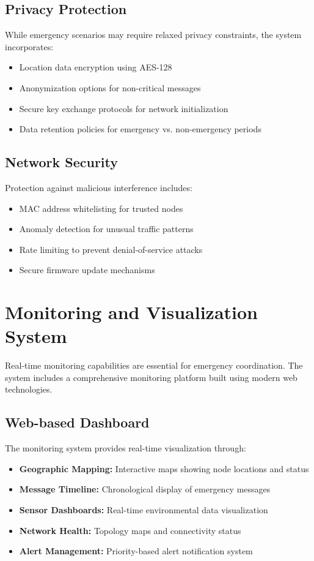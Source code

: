 \documentclass[conference]{IEEEtran}
\begin{document}
\subsection{Privacy Protection}

While emergency scenarios may require relaxed privacy constraints, the system incorporates:

\begin{itemize}
\item Location data encryption using AES-128
\item Anonymization options for non-critical messages
\item Secure key exchange protocols for network initialization
\item Data retention policies for emergency vs. non-emergency periods
\end{itemize}

\subsection{Network Security}

Protection against malicious interference includes:

\begin{itemize}
\item MAC address whitelisting for trusted nodes
\item Anomaly detection for unusual traffic patterns
\item Rate limiting to prevent denial-of-service attacks
\item Secure firmware update mechanisms
\end{itemize}

\section{Monitoring and Visualization System}

Real-time monitoring capabilities are essential for emergency coordination. The system includes a comprehensive monitoring platform built using modern web technologies.

\subsection{Web-based Dashboard}

The monitoring system provides real-time visualization through:

\begin{itemize}
\item \textbf{Geographic Mapping:} Interactive maps showing node locations and status
\item \textbf{Message Timeline:} Chronological display of emergency messages
\item \textbf{Sensor Dashboards:} Real-time environmental data visualization
\item \textbf{Network Health:} Topology maps and connectivity status
\item \textbf{Alert Management:} Priority-based alert notification system
\end{itemize}
\end{document}
